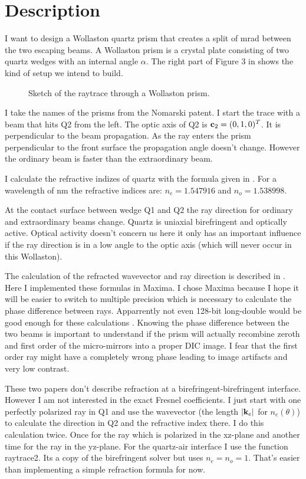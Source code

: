 \section{Description}
I want to design a Wollaston quartz prism that creates a split of
\unit[32]{mrad} between the two escaping beams.  A Wollaston prism is
a crystal plate consisting of two quartz wedges with an internal angle
$\alpha$. The right part of Figure 3 in \citep{Nomarski1960} shows the kind
of setup we intend to build. 
\begin{figure}[htbp]
  \centering
  
  \caption{Sketch of the raytrace through a Wollaston prism.}
\end{figure}
I take the names of the prisms from the Nomarski patent. I start the
trace with a beam that hits Q2 from the left. The optic axis of Q2 is
$\mathbf{c}_2=(0,1,0)^T$. It is perpendicular to the beam propagation. As
the ray enters the prism perpendicular to the front surface the
propagation angle doesn't change. However the ordinary beam is faster
than the extraordinary beam.

I calculate the refractive indizes of quartz with the formula given in
\citep{Ghosh1999}. For a wavelength of \unit[768]{nm} the refractive indices
are: $n_e=1.547916$ and $n_o=1.538998$.

At the contact surface between wedge Q1 and Q2 the ray direction for
ordinary and extraordinary beams change. Quartz is uniaxial
birefringent and optically active. Optical activity doesn't concern us
here it only has an important influence if the ray direction is in a
low angle to the optic axis (which will never occur in this Wollaston).

The calculation of the refracted wavevector and ray direction is
described in \citep{Lekner1991,Weidlich2008}. Here I implemented these
formulas in Maxima. I chose Maxima because I hope it will be easier to
switch to multiple precision which is necessary to calculate the phase
difference between rays. Apparrently not even 128-bit long-double
would be good enough for these calculations \cite{Lekner1991}. Knowing
the phase difference between the two beams is important to understand
if the prism will actually recombine zeroth and first order of the
micro-mirrors into a proper DIC image. I fear that the first order ray
might have a completely wrong phase leading to image artifacts and
very low contrast.

These two papers don't describe refraction at a
birefringent-birefringent interface. However I am not interested in
the exact Fresnel coefficients. I just start with one perfectly
polarized ray in Q1 and use the wavevector (the length $|\mathbf{k}_e|$
for $n_e(\theta)$) to calculate the direction in Q2 and the refractive
index there. I do this calculation twice. Once for the ray which is
polarized in the xz-plane and another time for the ray in the
yz-plane.  For the quartz-air interface I use the function raytrace2.
Its a copy of the birefringent solver but uses $n_e=n_o=1$. That's
easier than implementing a simple refraction formula for now.

